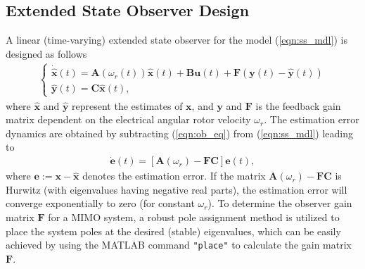 \documentclass[conference]{IEEEtran}
\begin{document}
\subsection{Extended State Observer Design}\label{subsec:ss_obs}

A linear (time-varying) extended state observer for the model (\ref{eqn:ss_mdl}) is designed as follows
    \begin{align}\label{eqn:ob_eq}
    \begin{cases}
    {{{{\dot {\hat{\boldsymbol{x}}}}}}(t)}=  {{\boldsymbol{A}}({\omega}_{r}(t))}{\hat{\boldsymbol{{x}}}(t)} + {\boldsymbol{B}}{\boldsymbol{u}}(t) + {{\boldsymbol{F}}}({\boldsymbol{y}}(t) - {\hat{\boldsymbol{{y}}}} (t))\\
    {\hat{\boldsymbol{{y}}}}(t) = {{\boldsymbol{C}}} {{\hat{\boldsymbol{{x}}}}}(t),
    \end{cases}
    \end{align}
where ${\hat{\boldsymbol{{x}}}}$ and ${\hat{\boldsymbol{{y}}}}$ represent the estimates of ${\boldsymbol{{x}}}$, and ${\boldsymbol{{y}}}$ and ${{\boldsymbol{F}}}$ is the feedback gain matrix dependent on the electrical angular rotor velocity $\omega_r$. The estimation error dynamics are obtained by subtracting (\ref{eqn:ob_eq}) from (\ref{eqn:ss_mdl}) leading to  
    \begin{align}    
    {{\boldsymbol{{\dot {e}}} }}(t)=\left[ {{\boldsymbol{A}}({\omega}_{r})} - {{\boldsymbol{F}}}{{\boldsymbol{C}}}\right] {\boldsymbol{{e}}}(t),
    \end{align} 
where ${{\boldsymbol{e}} } := {{\boldsymbol{x}} } -  {{\boldsymbol{\hat x}} }$ denotes the estimation error. If the matrix ${{\boldsymbol{A}}({\omega}_{r})} - {{\boldsymbol{F}}} {{\boldsymbol{C}}}$ is Hurwitz (with eigenvalues having negative real parts), the estimation error will converge exponentially to zero (for constant $\omega_r$). To determine the observer gain matrix ${{\boldsymbol{F}}}$ for a MIMO system, a robust pole assignment method \cite{b14} is utilized to place the system poles at the desired (stable) eigenvalues, which can be easily achieved by using the MATLAB command \texttt{"place"} to calculate the gain matrix ${{\boldsymbol{F}}}$.
\end{document}

